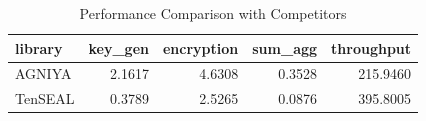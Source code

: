 \begin{table}[htbp]
\centering
\caption{Performance Comparison with Competitors}
\label{tab:competitors}
\begin{tabular}{lrrrr}
\toprule
library & key_gen & encryption & sum_agg & throughput \\
\midrule
AGNIYA & 2.1617 & 4.6308 & 0.3528 & 215.9460 \\
TenSEAL & 0.3789 & 2.5265 & 0.0876 & 395.8005 \\
\bottomrule
\end{tabular}
\end{table}
